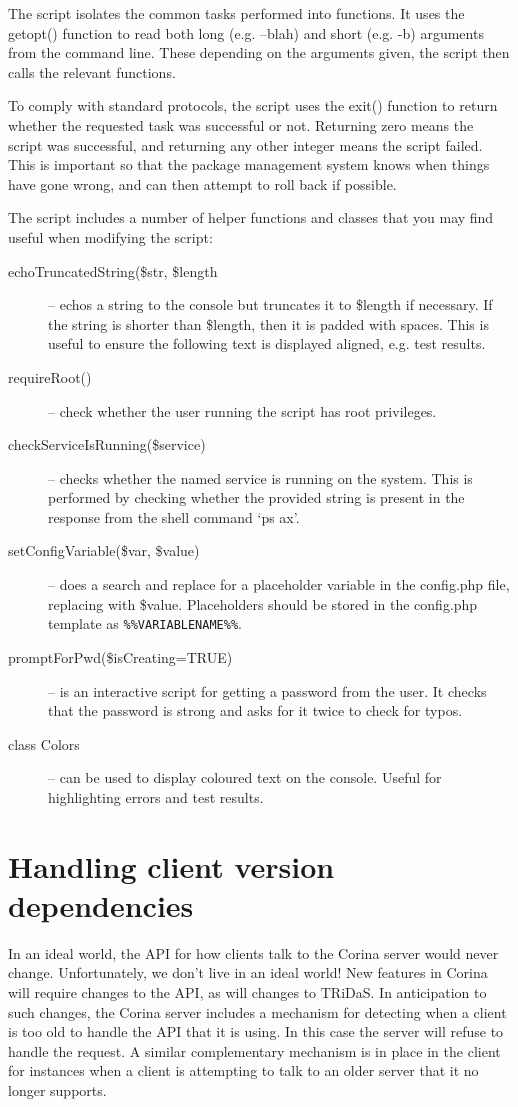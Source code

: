 The script isolates the common tasks performed into functions.  It uses the getopt() function to read both long (e.g. --blah) and short (e.g. -b) arguments from the command line.  These depending on the arguments given, the script then calls the relevant functions.

To comply with standard protocols, the script uses the exit() function to return whether the requested task was successful or not.  Returning zero means the script was successful, and returning any other integer means the script failed.  This is important so that the package management system knows when things have gone wrong, and can then attempt to roll back if possible.

The script includes a number of helper functions and classes that you may find useful when modifying the script:

\begin{description}
 \item[echoTruncatedString(\$str, \$length] -- echos a string to the console but truncates it to \$length if necessary.  If the string is shorter than \$length, then it is padded with spaces.  This is useful to ensure the following text is displayed aligned, e.g. test results.
 \item[requireRoot()] -- check whether the user running the script has root privileges.
 \item[checkServiceIsRunning(\$service)] -- checks whether the named service is running on the system.  This is performed by checking whether the provided string is present in the response from the shell command `ps ax'.
 \item[setConfigVariable(\$var, \$value)] -- does a search and replace for a placeholder variable in the config.php file, replacing with \$value.  Placeholders should be stored in the config.php template as \verb|%%VARIABLENAME%%|.
 \item[promptForPwd(\$isCreating=TRUE)] -- is an interactive script for getting a password from the user.  It checks that the password
 is strong and asks for it twice to check for typos. 
 \item[class Colors] -- can be used to display coloured text on the console.  Useful for highlighting errors and test results.

\end{description}

\section{Handling client version dependencies}
In an ideal world, the API for how clients talk to the Corina server would never change.  Unfortunately, we don't live in an ideal world!  New features in Corina will require changes to the API, as will changes to TRiDaS.  In anticipation to such changes, the Corina server includes a mechanism for detecting when a client is too old to handle the API that it is using.  In this case the server will refuse to handle the request.  A similar complementary mechanism is in place in the client for instances when a client is attempting to talk to an older server that it no longer supports.  

